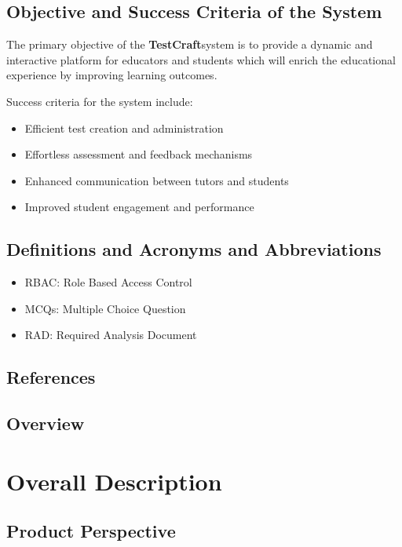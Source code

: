 \documentclass[11pt]{article}
\newcommand{\projectTitle}{\textbf{TestCraft}} %
\begin{document}
    \subsection{Objective and Success Criteria of the System}
    The primary objective of the \projectTitle \space system is to provide a dynamic and interactive
    platform for educators and students which will enrich the educational experience by improving learning outcomes.
    
    Success criteria for the system include:
    \begin{itemize}
        \item Efficient test creation and administration
        \item Effortless assessment and feedback mechanisms
        \item Enhanced communication between tutors and students
        \item Improved student engagement and performance
    \end{itemize}

    \subsection{Definitions and Acronyms and Abbreviations}
    \begin{itemize}
        \item RBAC: Role Based Access Control
        \item MCQs: Multiple Choice Question
        \item RAD: Required Analysis Document
    \end{itemize}

    \subsection{References}

    \subsection{Overview}


\section{Overall Description}

    \subsection{Product Perspective}
\end{document}
